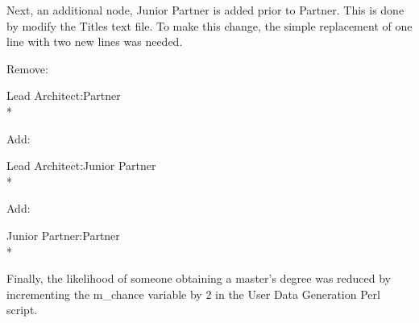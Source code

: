 \noindent Next, an additional node, Junior Partner is added prior to Partner. 
This is done by modify the Titles text file.  To make this change, the simple
replacement of one line with two new lines was needed.
	
	\begin{footnotesize}
	\indent Remove: \begin{tt}Lead Architect:Partner\\*\end{tt}
	\indent Add: \begin{tt}Lead Architect:Junior Partner\\*\end{tt}
	\indent Add: \begin{tt}Junior Partner:Partner\\*\end{tt}
	\end{footnotesize}
	
\noindent Finally, the likelihood of someone obtaining a master's degree was
reduced by incrementing the m\_chance variable by 2 in the User Data Generation
Perl script.



\usetikzlibrary{shapes,arrows,chains}


